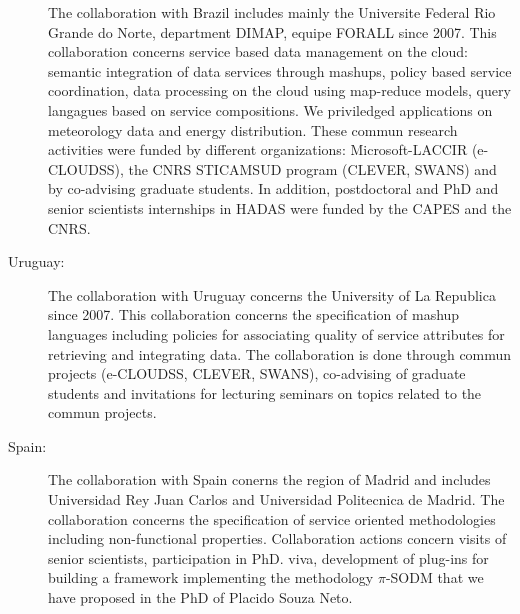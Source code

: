 \begin{description}
The collaboration with Brazil includes mainly
the Universite Federal Rio Grande do Norte, department DIMAP,  equipe FORALL since 2007. This collaboration concerns service based data management on the cloud: semantic integration of data services through mashups, policy based service coordination, data processing on the cloud using map-reduce models, query langagues based on service compositions.  We priviledged applications on meteorology data and energy distribution. These commun research activities were funded by different organizations: 
Microsoft-LACCIR (e-CLOUDSS), the CNRS STICAMSUD program (CLEVER, SWANS) and by co-advising graduate students. In addition, postdoctoral and PhD and senior scientists internships in HADAS were funded by the CAPES and the CNRS.   

\item[Uruguay:] 

The collaboration with Uruguay concerns the University of La Republica since 2007. This collaboration concerns the specification of mashup languages including policies for associating quality of service attributes for retrieving and integrating data. The collaboration is done through commun projects (e-CLOUDSS, CLEVER, SWANS), co-advising of graduate students and invitations for lecturing seminars on topics related to the commun projects.

\item[Spain:] 

The collaboration with Spain conerns the region of Madrid and includes Universidad Rey Juan Carlos and Universidad Politecnica de Madrid. The collaboration concerns the specification of service oriented methodologies including non-functional properties. Collaboration actions concern visits of senior scientists, participation in PhD. viva, development of plug-ins for building a framework implementing the methodology $\pi$-SODM that we have proposed in the PhD of Placido Souza Neto. 



\end{description}



